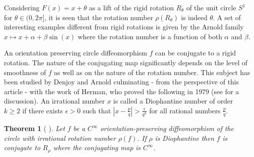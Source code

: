 \documentclass[12pt]{article}
\newtheorem{theorem}{Theorem}[section]
\begin{document}
Considering  $F(x)=x+\theta$ as a lift of the rigid rotation $R_{\theta}$ of the unit circle $S^1$ for $\theta \in (0, 2 \pi]$, it is seen that the rotation number  $\rho(R_\theta)$ is indeed $\theta$.
 A set of interesting examples different from rigid rotations is given by the Arnold family  $x \mapsto x+\alpha +\beta \sin(x)$ where the rotation number is a function of both $\alpha$ and $\beta$.
 
An orientation preserving circle diffeomorphism $f$ can be conjugate to a rigid rotation. The nature of the conjugating map significantly depends on the level of smoothness of $f$ as well as on the nature of the rotation number. This subject has been studied by Denjoy and Arnold culminating - from the perspective of this article -  with the work of Herman, who proved the following in 1979 (see \cite{yoc} for a discussion).  An irrational number $x$ is called a Diophantine number of order $k\geq 2$ if there exists $\epsilon >0$ such that $|x-\frac{p}{q}|>\frac{\epsilon}{q^k}$ for all rational numbers $\frac{p}{q}$.

\begin{theorem}[\cite{herman1984exemples} ]
	Let \( f \) be a 	\( C^\infty \)  orientation-preserving diffeomorphism of the circle  with irrational rotation number \( \rho(f) \). If \( \rho \) is Diophantine then \( f \) is conjugate to \( R_\rho \) where the conjugating map is \( C^\infty \).
\end{theorem}
\end{document}
